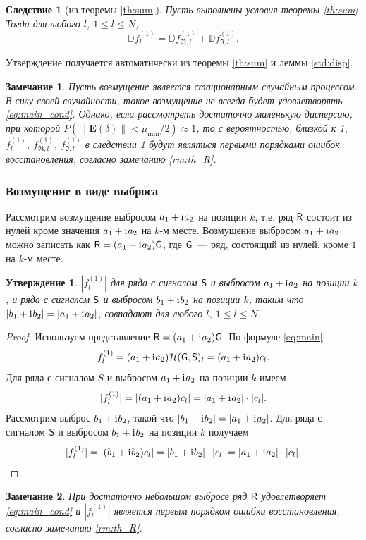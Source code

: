 \documentclass[specialist,
               substylefile = spbu.rtx,
               subf,href,colorlinks=true, 12pt]{disser}
\newtheorem{statement}{Утверждение}
\newtheorem{remark}{Замечание}
\newtheorem{corollary}{Следствие}
\begin{document}
\begin{corollary}[из теоремы {\ref{th:sum}}] \label{st:dispsum}
	Пусть выполнены условия теоремы \ref{th:sum}.
	Тогда для любого $l$, $1\le l \le N$,
	\begin{equation} \label{eq:dispsum}
		\mathbb{D}f^{(1)}_l = \mathbb{D}f^{(1)}_{\Re, l} + \mathbb{D}f^{(1)}_{\Im, l}.	
	\end{equation}
\end{corollary}

Утверждение получается автоматически из теоремы \ref{th:sum} и леммы \ref{std:disp}.

\begin{remark}
	Пусть возмущение является стационарным случайным процессом. В силу своей случайности, такое возмущение не всегда будет удовлетворять \eqref{eq:main_cond}. Однако, если рассмотреть достаточно маленькую дисперсию, при которой $P(\|\mathbf{E}(\delta)\| < \mu_{\min} / 2) \approx 1$, то с вероятностью, близкой к 1, $f^{(1)}_l$, $f^{(1)}_{\Re, l}$, $f^{(1)}_{\Im, l}$ в следствии \ref{st:dispsum} будут являться первыми порядками ошибок восстановления, согласно замечанию \ref{rm:th_R}.
\end{remark}

\subsubsection{Возмущение в виде выброса} \label{ss:RMSEinv}

Рассмотрим возмущение выбросом $a_1 + \mathrm{i}\mkern1mu a_2$ на позиции $k$, т.е. ряд $\textsf{R}$ состоит из нулей кроме значения $a_1 + \mathrm{i}\mkern1mu a_2$ на $k$-м месте.
Возмущение выбросом $a_1 + \mathrm{i}\mkern1mu a_2$ можно записать как  $\textsf{R} = (a_1 + \mathrm{i}\mkern1mu a_2)\textsf{G}$, где $\textsf{G}$~--- ряд, состоящий из нулей, кроме $1$ на $k$-м месте.

\begin{statement}\label{st:RMSEinv}
	$|f_l^{(1)}|$ для ряда с сигналом $\textsf{S}$ и выбросом $a_1 + \mathrm{i}\mkern1mu a_2$ на позиции $k$, и  ряда с сигналом $\textsf{S}$ и выбросом $b_1 + \mathrm{i}\mkern1mu b_2$ на позиции $k$, таким что $|b_1 + \mathrm{i}\mkern1mu b_2| = |a_1 + \mathrm{i}\mkern1mu a_2|$, совпадают для любого $l$, $1\le l \le N$.
\end{statement}
\begin{proof}
	Используем представление $\textsf{R} = (a_1 + \mathrm{i}\mkern1mu a_2)\textsf{G}$.
	По формуле \eqref{eq:main}
	$$f^{(1)}_l = (a_1 + \mathrm{i}\mkern1mu a_2)\mathcal{H}(\textsf{G}, \textsf{S})_l = (a_1 + \mathrm{i}\mkern1mu a_2)c_l.$$
	Для ряда с сигналом $S$ и выбросом $a_1 + \mathrm{i}\mkern1mu a_2$ на позиции $k$ имеем
	$$|f^{(1)}_l| = |(a_1 + \mathrm{i}\mkern1mu a_2)c_l| = |a_1 + \mathrm{i}\mkern1mu a_2|\cdot|c_l|. $$
	Рассмотрим выброс $b_1 + \mathrm{i}\mkern1mu b_2$, такой что $|b_1 + \mathrm{i}\mkern1mu b_2| = |a_1 + \mathrm{i}\mkern1mu a_2|$.
	Для ряда с сигналом $\textsf{S}$ и выбросом $b_1 + \mathrm{i}\mkern1mu b_2$ на позиции $k$ получаем
	$$|f^{(1)}_l| = |(b_1 + \mathrm{i}\mkern1mu b_2)c_l| = |b_1 + \mathrm{i}\mkern1mu b_2|\cdot|c_l| = |a_1 + \mathrm{i}\mkern1mu a_2|\cdot|c_l|. $$
\end{proof}
\begin{remark} \label{rm:outl_R}
	При достаточно небольшом выбросе ряд $\textsf{R}$ удовлетворяет \eqref{eq:main_cond} и $|f_l^{(1)}|$ является первым порядком ошибки восстановления, согласно замечанию \ref{rm:th_R}.
\end{remark}
\end{document}
